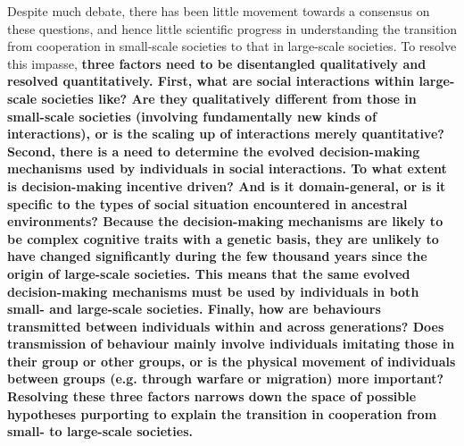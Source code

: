 \documentclass[10pt, a4paper, fleqn]{article}
\begin{document}
Despite much debate, there has been little movement towards a consensus on these questions, and hence little scientific progress in understanding the transition from cooperation in small-scale societies to that in large-scale societies. To resolve this impasse, \textbf{three factors need to be disentangled qualitatively and resolved quantitatively. First, what are social interactions within large-scale societies like? Are they qualitatively different from those in small-scale societies (involving fundamentally new kinds of interactions), or is the scaling up of interactions merely quantitative?  Second, there is a need to determine the evolved decision-making mechanisms used by individuals in social interactions. To what extent is decision-making incentive driven? And is it domain-general, or is it specific to the types of social situation encountered in ancestral environments? Because the decision-making mechanisms are likely to be complex cognitive traits with a genetic basis, they are unlikely to have changed significantly during the few thousand years since the origin of large-scale societies. This means that the same evolved decision-making mechanisms must be used by individuals in both small- and large-scale societies. Finally, how are behaviours transmitted between individuals within and across generations? Does transmission of behaviour mainly involve individuals imitating those in their group or other groups, or is the physical movement of individuals between groups (e.g. through warfare or migration) more important? Resolving these three factors narrows down the space of possible hypotheses purporting to explain the transition in cooperation from small- to large-scale societies.} 

\end{document}
